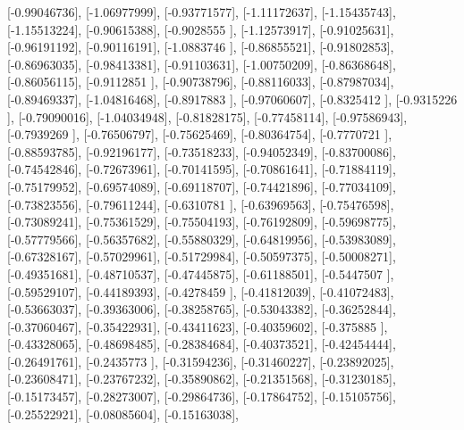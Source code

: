 \documentclass{article}
\begin{document}
       [-0.99046736],
       [-1.06977999],
       [-0.93771577],
       [-1.11172637],
       [-1.15435743],
       [-1.15513224],
       [-0.90615388],
       [-0.9028555 ],
       [-1.12573917],
       [-0.91025631],
       [-0.96191192],
       [-0.90116191],
       [-1.0883746 ],
       [-0.86855521],
       [-0.91802853],
       [-0.86963035],
       [-0.98413381],
       [-0.91103631],
       [-1.00750209],
       [-0.86368648],
       [-0.86056115],
       [-0.9112851 ],
       [-0.90738796],
       [-0.88116033],
       [-0.87987034],
       [-0.89469337],
       [-1.04816468],
       [-0.8917883 ],
       [-0.97060607],
       [-0.8325412 ],
       [-0.9315226 ],
       [-0.79090016],
       [-1.04034948],
       [-0.81828175],
       [-0.77458114],
       [-0.97586943],
       [-0.7939269 ],
       [-0.76506797],
       [-0.75625469],
       [-0.80364754],
       [-0.7770721 ],
       [-0.88593785],
       [-0.92196177],
       [-0.73518233],
       [-0.94052349],
       [-0.83700086],
       [-0.74542846],
       [-0.72673961],
       [-0.70141595],
       [-0.70861641],
       [-0.71884119],
       [-0.75179952],
       [-0.69574089],
       [-0.69118707],
       [-0.74421896],
       [-0.77034109],
       [-0.73823556],
       [-0.79611244],
       [-0.6310781 ],
       [-0.63969563],
       [-0.75476598],
       [-0.73089241],
       [-0.75361529],
       [-0.75504193],
       [-0.76192809],
       [-0.59698775],
       [-0.57779566],
       [-0.56357682],
       [-0.55880329],
       [-0.64819956],
       [-0.53983089],
       [-0.67328167],
       [-0.57029961],
       [-0.51729984],
       [-0.50597375],
       [-0.50008271],
       [-0.49351681],
       [-0.48710537],
       [-0.47445875],
       [-0.61188501],
       [-0.5447507 ],
       [-0.59529107],
       [-0.44189393],
       [-0.4278459 ],
       [-0.41812039],
       [-0.41072483],
       [-0.53663037],
       [-0.39363006],
       [-0.38258765],
       [-0.53043382],
       [-0.36252844],
       [-0.37060467],
       [-0.35422931],
       [-0.43411623],
       [-0.40359602],
       [-0.375885  ],
       [-0.43328065],
       [-0.48698485],
       [-0.28384684],
       [-0.40373521],
       [-0.42454444],
       [-0.26491761],
       [-0.2435773 ],
       [-0.31594236],
       [-0.31460227],
       [-0.23892025],
       [-0.23608471],
       [-0.23767232],
       [-0.35890862],
       [-0.21351568],
       [-0.31230185],
       [-0.15173457],
       [-0.28273007],
       [-0.29864736],
       [-0.17864752],
       [-0.15105756],
       [-0.25522921],
       [-0.08085604],
       [-0.15163038],
\end{document}

